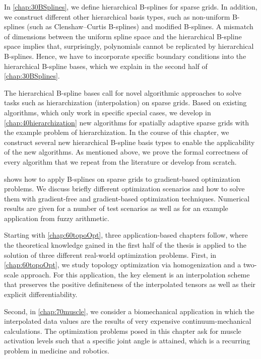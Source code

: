 In \cref{chap:30BSplines}, we define hierarchical B-splines for sparse grids.
In addition, we construct different other hierarchical basis types, such as
non-uniform B-splines (such as Clenshaw--Curtis B-splines) and
modified B-splines.
A mismatch of dimensions between the uniform spline space and the
hierarchical B-spline space implies that, surprisingly,
polynomials cannot be replicated by hierarchical B-splines.
Hence, we have to incorporate specific boundary conditions
 into the hierarchical B-spline bases,
which we explain in the second half of \cref{chap:30BSplines}.

The hierarchical B-spline bases call for novel algorithmic approaches
to solve tasks such as hierarchization (interpolation) on sparse grids.
Based on existing algorithms, which only work in specific special cases,
we develop in \cref{chap:40hierarchization} new algorithms for
spatially adaptive sparse grids with the example problem of hierarchization.
In the course of this chapter, we construct several new
hierarchical B-spline basis types to enable the
applicability of the new algorithms.
As mentioned above, we prove the formal correctness of every algorithm
that we repeat from the literature or develop from scratch.

 shows how to apply B-splines on sparse grids
to gradient-based optimization problems.
We discuss briefly different optimization scenarios and how to solve them
with gradient-free and gradient-based optimization techniques.
Numerical results are given for a number of test scenarios as well
as for an example application from fuzzy arithmetic.

Starting with \cref{chap:60topoOpt}, three application-based chapters follow,
where the theoretical knowledge gained in the first half of the thesis
is applied to the solution of three different real-world optimization problems.
%
First, in \cref{chap:60topoOpt},
we study topology optimization via homogenization
and a two-scale approach.
For this application, the key element is an interpolation scheme
that preserves the positive definiteness of the interpolated tensors as
well as their explicit differentiability.

Second, in \cref{chap:70muscle},
we consider a biomechanical application in which the interpolated data values
are the results of very expensive continuum-mechanical calculations.
The optimization problems posed in this chapter ask for
muscle activation levels such that a specific joint angle is attained,
which is a recurring problem in medicine and robotics.

